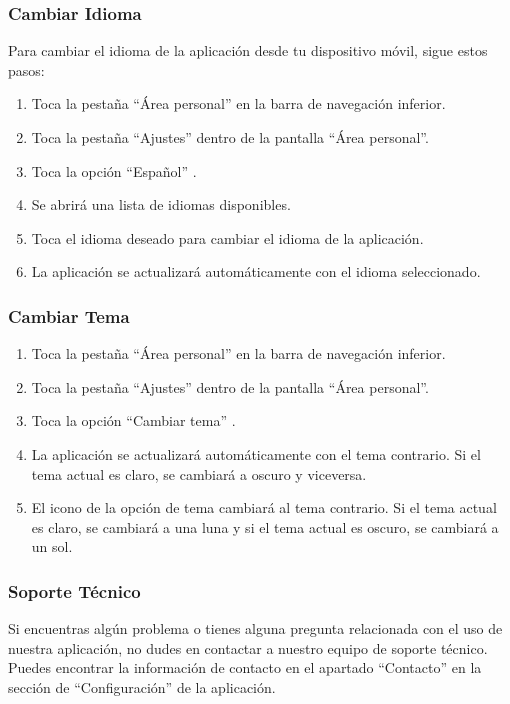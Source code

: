 \subsubsection{Cambiar Idioma}
Para cambiar el idioma de la aplicación desde tu dispositivo móvil, sigue estos pasos:
\begin{enumerate}
	\item Toca la pestaña “Área personal” en la barra de navegación inferior.
	\item Toca la pestaña “Ajustes” dentro de la pantalla “Área personal”.
	\item Toca la opción “Español” .
	\item Se abrirá una lista de idiomas disponibles.
	\item Toca el idioma deseado para cambiar el idioma de la aplicación.
	\item La aplicación se actualizará automáticamente con el idioma seleccionado.
\end{enumerate}

\subsubsection{Cambiar Tema}
\begin{enumerate}
	\item Toca la pestaña “Área personal” en la barra de navegación inferior.
	\item Toca la pestaña “Ajustes” dentro de la pantalla “Área personal”.
	\item Toca la opción “Cambiar tema” .
	\item La aplicación se actualizará automáticamente con el tema contrario. Si el tema actual es claro, se cambiará a oscuro y viceversa.
	\item El icono de la opción de tema cambiará al tema contrario. Si el tema actual es claro, se cambiará a una luna y si el tema actual es oscuro, se cambiará a un sol.
\end{enumerate}

\subsubsection{Soporte Técnico}
Si encuentras algún problema o tienes alguna pregunta relacionada con el uso de nuestra aplicación, no dudes en contactar a nuestro equipo de soporte técnico. Puedes encontrar la información de contacto en el apartado “Contacto” en la sección de “Configuración” de la aplicación.